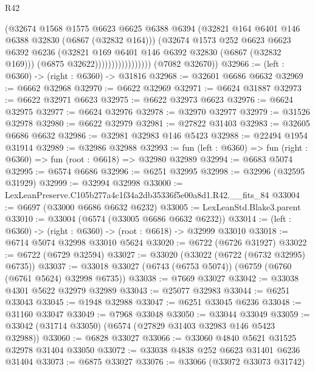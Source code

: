 \begin{lexlean}{R42}
\begin{coremodule}
{                                  (@32674
                                    @1568
                                    @1575
                                    @6623
                                    @6625
                                    @6388
                                    @6394
                                    (@32821 @164 @6401 @146 @6388 @32830 (@6867 (@32832 @164)))
                                    (@32674
                                      @1573
                                      @252
                                      @6623
                                      @6623
                                      @6392
                                      @6236
                                      (@32821 @169 @6401 @146 @6392 @32830 (@6867 (@32832 @169)))
                                      (@6875 @32622)))))))))))))))))
      (@7082 @32670))
@32966 := (left : @6360) -> (right : @6360) -> @31816
@32968 := @32601 @6686 @6632
@32969 := @6662 @32968
@32970 := @6622 @32969
@32971 := @6624 @31887
@32973 := @6622 @32971 @6623
@32975 := @6622 @32973 @6623
@32976 := @6624 @32975
@32977 := @6624 @32976
@32978 := @32970 @32977
@32979 := @31526 @32978
@32980 := @6622 @32979
@32981 := @27822 @31403
@32983 := @32605 @6686 @6632
@32986 := @32981 @32983 @146 @5423
@32988 := @22494 @1954 @31914
@32989 := @32986 @32988
@32993 := fun (left : @6360) => fun (right : @6360) => fun (root : @6618) => @32980 @32989
@32994 := @6683 @5074
@32995 := @6574 @6686
@32996 := @6251 @32995
@32998 := @32996 (@32595 @31929)
@32999 := @32994 @32998
@33000 := LexLeanPreserve.C105b277a4c1f34a2db35336f5e00a8d1.R42.__fits_84
@33004 := @6697 (@33000 @6686 @6632 @6232)
@33005 := LexLeanStd.Blake3.parent
@33010 := @33004 (@6574 (@33005 @6686 @6632 @6232))
@33014 := (left : @6360) -> (right : @6360) -> (root : @6618) -> @32999 @33010
@33018 := @6714 @5074 @32998 @33010 @5624
@33020 := @6722 (@6726 @31927)
@33022 := @6722 (@6729 @32594)
@33027 := @33020 (@33022 (@6722 (@6732 @32995) @6735))
@33037 := @33018 @33027 (@6743 (@6753 @5074)) (@6759 (@6760 (@6761 @5624) @32998 @6735))
@33038 := @7669 @33027
@33042 := @33038 @4301 @5622 @32979 @32989
@33043 := @25077 @32983
@33044 := @6251 @33043
@33045 := @1948 @32988
@33047 := @6251 @33045 @6236
@33048 := @31160 @33047
@33049 := @7968 @33048
@33050 := @33044 @33049
@33059 := @33042 (@31714 @33050) (@6574 (@27829 @31403 @32983 @146 @5423 @32988))
@33060 := @6828 @33027
@33066 := @33060 @4840 @5621 @31525 @32978 @31404 @33050
@33072 := @33038 @4838 @252 @6623 @31401 @6236 @31404
@33073 := @6875 @33027
@33076 := @33066 (@33072 @33073 @31742)
}
\end{coremodule}
\end{lexlean}
